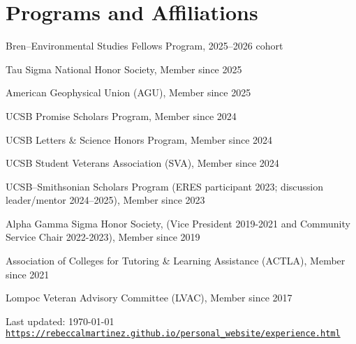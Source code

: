 \documentclass[letterpaper]{article}
\def\footerlink{https://rebeccalmartinez.github.io/personal_website/experience.html}
\renewenvironment{itemize}{
  \begin{list}{}{
    \setlength{\leftmargin}{1.5em}
  }
}{
  \end{list}
}
\begin{document}
\section*{Programs and Affiliations}

\begin{itemize}
\item Bren–Environmental Studies Fellows Program, 2025–2026 cohort
\item Tau Sigma National Honor Society, Member since 2025
\item American Geophysical Union (AGU), Member since 2025
\item UCSB Promise Scholars Program, Member since 2024
\item UCSB Letters \& Science Honors Program, Member since 2024
\item UCSB Student Veterans Association (SVA), Member since 2024
\item UCSB–Smithsonian Scholars Program (ERES participant 2023; discussion leader/mentor 2024–2025), Member since 2023
\item Alpha Gamma Sigma Honor Society, (Vice President 2019-2021 and Community Service Chair 2022-2023), Member since 2019
\item Association of Colleges for Tutoring \& Learning Assistance (ACTLA), Member since 2021
\item Lompoc Veteran Advisory Committee (LVAC), Member since 2017
\end{itemize}

 
\bigskip

\begin{center}
  \begin{footnotesize}
    Last updated: \today \\
    \href{\footerlink}{\texttt{\footerlink}}
  \end{footnotesize}
\end{center}
\end{document}
